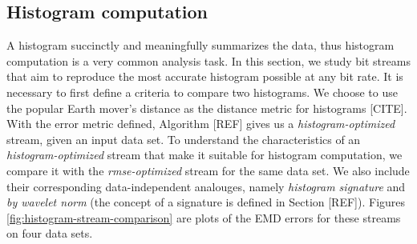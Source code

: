 
\subsection{Histogram computation}
\label{sec:histogram}

A histogram succinctly and meaningfully summarizes the data, thus histogram computation is a very
common analysis task. In this section, we study bit streams that aim to reproduce the most accurate
histogram possible at any bit rate. It is necessary to first define a criteria to compare two
histograms. We choose to use the popular Earth mover's distance as the distance metric for
histograms [CITE]. With the error metric defined, Algorithm [REF] gives us a
\emph{histogram-optimized} stream, given an input data set. To understand the characteristics of an
\emph{histogram-optimized} stream that make it suitable for histogram computation, we compare it
with the \emph{rmse-optimized} stream for the same data set. We also include their corresponding
data-independent analouges, namely \emph{histogram signature} and \emph{by wavelet norm} (the
concept of a signature is defined in Section [REF]). Figures \ref{fig:histogram-stream-comparison}
are plots of the EMD errors for these streams on four data sets.

